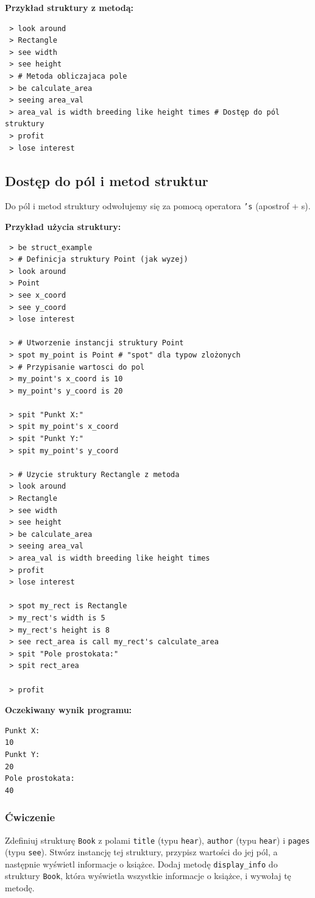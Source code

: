 \documentclass[12pt,a4paper]{article}
\begin{document}
\textbf{Przykład struktury z metodą:}
\begin{lstlisting}
 > look around
 > Rectangle
 > see width
 > see height
 > # Metoda obliczajaca pole
 > be calculate_area
 > seeing area_val
 > area_val is width breeding like height times # Dostęp do pól struktury
 > profit
 > lose interest
\end{lstlisting}

\subsection{Dostęp do pól i metod struktur}
Do pól i metod struktury odwołujemy się za pomocą operatora \texttt{'s} (apostrof + s).

\textbf{Przykład użycia struktury:}
\begin{lstlisting}
 > be struct_example
 > # Definicja struktury Point (jak wyzej)
 > look around
 > Point
 > see x_coord
 > see y_coord
 > lose interest

 > # Utworzenie instancji struktury Point
 > spot my_point is Point # "spot" dla typow zlożonych
 > # Przypisanie wartosci do pol
 > my_point's x_coord is 10
 > my_point's y_coord is 20

 > spit "Punkt X:"
 > spit my_point's x_coord
 > spit "Punkt Y:"
 > spit my_point's y_coord

 > # Uzycie struktury Rectangle z metoda
 > look around
 > Rectangle
 > see width
 > see height
 > be calculate_area
 > seeing area_val
 > area_val is width breeding like height times
 > profit
 > lose interest

 > spot my_rect is Rectangle
 > my_rect's width is 5
 > my_rect's height is 8
 > see rect_area is call my_rect's calculate_area
 > spit "Pole prostokata:"
 > spit rect_area

 > profit
\end{lstlisting}
\textbf{Oczekiwany wynik programu:}
\begin{verbatim}
Punkt X:
10
Punkt Y:
20
Pole prostokata:
40
\end{verbatim}

\subsubsection*{Ćwiczenie}
Zdefiniuj strukturę \texttt{Book} z polami \texttt{title} (typu \texttt{hear}), \texttt{author} (typu \texttt{hear}) i \texttt{pages} (typu \texttt{see}). Stwórz instancję tej struktury, przypisz wartości do jej pól, a następnie wyświetl informacje o książce. Dodaj metodę \texttt{display\_info} do struktury \texttt{Book}, która wyświetla wszystkie informacje o książce, i wywołaj tę metodę.
\end{document}
